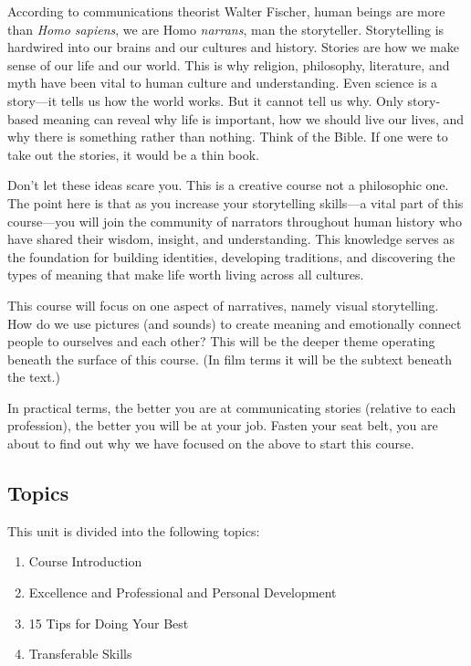 \documentclass[
]{book}
\providecommand{\tightlist}{%
  \setlength{\itemsep}{0pt}\setlength{\parskip}{0pt}}
\begin{document}
According to communications theorist Walter Fischer, human beings are more than \emph{Homo sapiens}, we are Homo \emph{narrans}, man the storyteller. Storytelling is hardwired into our brains and our cultures and history. Stories are how we make sense of our life and our world. This is why religion, philosophy, literature, and myth have been vital to human culture and understanding. Even science is a story---it tells us how the world works. But it cannot tell us why. Only story-based meaning can reveal why life is important, how we should live our lives, and why there is something rather than nothing. Think of the Bible. If one were to take out the stories, it would be a thin book.

Don't let these ideas scare you. This is a creative course not a philosophic one. The point here is that as you increase your storytelling skills---a vital part of this course---you will join the community of narrators throughout human history who have shared their wisdom, insight, and understanding. This knowledge serves as the foundation for building identities, developing traditions, and discovering the types of meaning that make life worth living across all cultures.

This course will focus on one aspect of narratives, namely visual storytelling. How do we use pictures (and sounds) to create meaning and emotionally connect people to ourselves and each other? This will be the deeper theme operating beneath the surface of this course. (In film terms it will be the subtext beneath the text.)

In practical terms, the better you are at communicating stories (relative to each profession), the better you will be at your job. Fasten your seat belt, you are about to find out why we have focused on the above to start this course.

\hypertarget{topics}{%
\subsection*{Topics}\label{topics}}

This unit is divided into the following topics:

\begin{enumerate}
\def\labelenumi{\arabic{enumi}.}
\tightlist
\item
  Course Introduction\\
\item
  Excellence and Professional and Personal Development\\
\item
  15 Tips for Doing Your Best\\
\item
  Transferable Skills
\end{enumerate}
\end{document}
